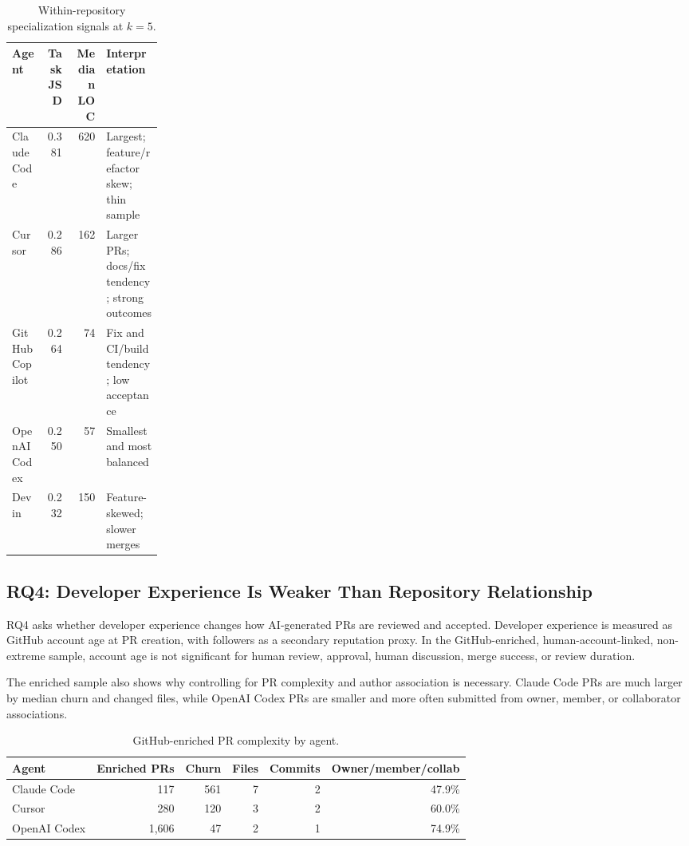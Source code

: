\documentclass[sigconf,nonacm]{acmart}
\begin{document}
\begin{table}[!htbp]
\caption{Within-repository specialization signals at $k=5$.}
\label{tab:specialization}
\centering
\scriptsize
\begin{tabularx}{\linewidth}{>{\raggedright\arraybackslash}p{0.22\linewidth}rrX}
\toprule
Agent & Task JSD & Median LOC & Interpretation \\
\midrule
Claude Code & 0.381 & 620 & Largest; feature/refactor skew; thin sample \\
Cursor & 0.286 & 162 & Larger PRs; docs/fix tendency; strong outcomes \\
GitHub Copilot & 0.264 & 74 & Fix and CI/build tendency; low acceptance \\
OpenAI Codex & 0.250 & 57 & Smallest and most balanced \\
Devin & 0.232 & 150 & Feature-skewed; slower merges \\
\bottomrule
\end{tabularx}
\end{table}

\FloatBarrier
\subsection{RQ4: Developer Experience Is Weaker Than Repository Relationship}

RQ4 asks whether developer experience changes how AI-generated PRs are reviewed and accepted. Developer experience is measured as GitHub account age at PR creation, with followers as a secondary reputation proxy. In the GitHub-enriched, human-account-linked, non-extreme sample, account age is not significant for human review, approval, human discussion, merge success, or review duration.

The enriched sample also shows why controlling for PR complexity and author association is necessary. Claude Code PRs are much larger by median churn and changed files, while OpenAI Codex PRs are smaller and more often submitted from owner, member, or collaborator associations.

\begin{table}[!htbp]
\caption{GitHub-enriched PR complexity by agent.}
\label{tab:enriched-complexity}
\centering
\scriptsize
\begin{adjustbox}{max width=\linewidth}
\begin{tabular}{lrrrrr}
\toprule
Agent & Enriched PRs & Churn & Files & Commits & Owner/member/collab \\
\midrule
Claude Code & 117 & 561 & 7 & 2 & 47.9\% \\
Cursor & 280 & 120 & 3 & 2 & 60.0\% \\
OpenAI Codex & 1,606 & 47 & 2 & 1 & 74.9\% \\
\bottomrule
\end{tabular}
\end{adjustbox}
\end{table}
\end{document}
